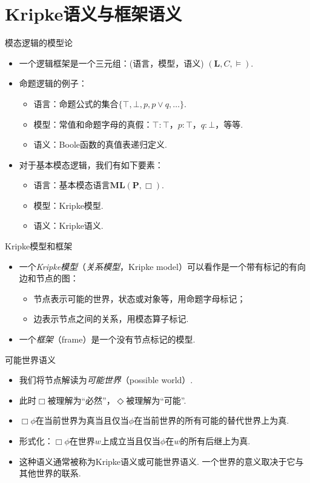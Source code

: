     
    \section{Kripke语义与框架语义}
    {模态逻辑的模型论} 
    \begin{itemize} 
    \item 一个逻辑框架是一个三元组：(语言，模型，语义) $(\mathbf L,C,\vDash)$.
    \item 命题逻辑的例子：
    \begin{itemize}
        \item 语言：命题公式的集合$\{\top,\bot,p,p\vee q,\dots\}$.
        \item 模型：常值和命题字母的真假：$\top:\top$，$p:\top$，$q:\bot$，等等.
        \item 语义：Boole函数的真值表递归定义.
    \end{itemize}
    \item 对于基本模态逻辑，我们有如下要素：
    \begin{itemize}
        \item 语言：基本模态语言$\mathbf{ML}(\mathbf P, \Box)$.
        \item 模型：Kripke模型.
        \item 语义：Kripke语义.
    \end{itemize}
    \end{itemize} 
    
    
    {Kripke模型和框架} 
    \begin{itemize} 
    \item 一个\emph{Kripke模型}（\emph{关系模型}，Kripke model）可以看作是一个带有标记的有向边和节点的图： 
    \begin{itemize} 
    \item 节点表示可能的世界，状态或对象等，用命题字母标记； 
    \item 边表示节点之间的关系，用模态算子标记.
    \end{itemize} 
    \item 一个\emph{框架}（frame）是一个没有节点标记的模型.
    \end{itemize} 
    
    
    {可能世界语义} 
    \begin{itemize} 
    \item 我们将节点解读为\emph{可能世界}（possible world）.
    \item 此时$\Box$被理解为“必然”，$\Diamond$被理解为“可能”.
    \item $\Box\phi$在当前世界为真当且仅当$\phi$在当前世界的所有可能的替代世界上为真.
    \item 形式化：$\Box\phi$在世界$w$上成立当且仅当$\phi$在$w$的所有后继上为真.
    \item 这种语义通常被称为Kripke语义或可能世界语义. 一个世界的意义取决于它与其他世界的联系.
    \end{itemize} 
    

